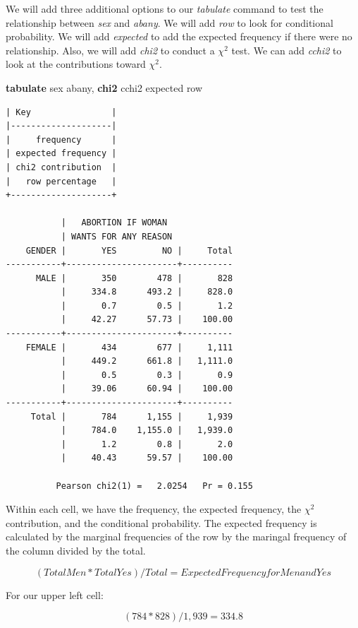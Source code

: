 \documentclass[
]{book}
\newenvironment{Shaded}{\begin{snugshade}}{\end{snugshade}}
\newcommand{\FunctionTok}[1]{\textcolor[rgb]{0.13,0.29,0.53}{\textbf{#1}}}
\newcommand{\KeywordTok}[1]{\textcolor[rgb]{0.13,0.29,0.53}{\textbf{#1}}}
\newcommand{\NormalTok}[1]{#1}
\newcommand{\OtherTok}[1]{\textcolor[rgb]{0.56,0.35,0.01}{#1}}
\begin{document}
We will add three additional options to our \emph{tabulate} command to test the relationship between \emph{sex} and \emph{abany}. We will add \emph{row} to look for conditional probability. We will add \emph{expected} to add the expected frequency if there were no relationship. Also, we will add \emph{chi2} to conduct a \(\chi^2\) test. We can add \emph{cchi2} to look at the contributions toward \(\chi^2\).

\begin{Shaded}
\begin{Highlighting}[]
\KeywordTok{tabulate}\NormalTok{ sex abany, }\FunctionTok{chi2}\NormalTok{ cchi2 expected }\OtherTok{row}
\end{Highlighting}
\end{Shaded}

\begin{verbatim}
| Key                |
|--------------------|
|     frequency      |
| expected frequency |
| chi2 contribution  |
|   row percentage   |
+--------------------+

           |   ABORTION IF WOMAN
           | WANTS FOR ANY REASON
    GENDER |       YES         NO |     Total
-----------+----------------------+----------
      MALE |       350        478 |       828 
           |     334.8      493.2 |     828.0 
           |       0.7        0.5 |       1.2 
           |     42.27      57.73 |    100.00 
-----------+----------------------+----------
    FEMALE |       434        677 |     1,111 
           |     449.2      661.8 |   1,111.0 
           |       0.5        0.3 |       0.9 
           |     39.06      60.94 |    100.00 
-----------+----------------------+----------
     Total |       784      1,155 |     1,939 
           |     784.0    1,155.0 |   1,939.0 
           |       1.2        0.8 |       2.0 
           |     40.43      59.57 |    100.00 

          Pearson chi2(1) =   2.0254   Pr = 0.155
\end{verbatim}

Within each cell, we have the frequency, the expected frequency, the \(\chi^2\) contribution, and the conditional probability. The expected frequency is calculated by the marginal frequencies of the row by the maringal frequency of the column divided by the total.

\[ (Total Men * Total Yes)/Total = Expected Frequency for Men and Yes \]

For our upper left cell:

\[ (784*828)/1,939 = 334.8 \]
\end{document}
